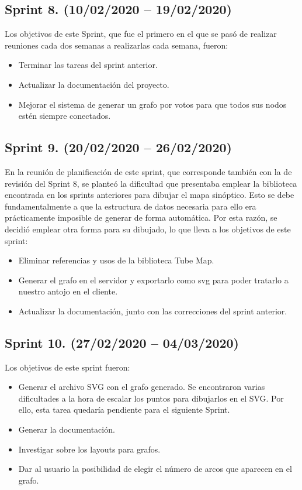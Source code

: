 \subsection{Sprint 8. (10/02/2020 -- 19/02/2020)}
Los objetivos de este Sprint, que fue el primero en el que se pasó de realizar reuniones cada dos semanas a realizarlas cada semana, fueron:
\begin{itemize}
	\item Terminar las tareas del sprint anterior.
	\item Actualizar la documentación del proyecto.
	\item Mejorar el sistema de generar un grafo por votos para que todos sus nodos estén siempre conectados.
\end{itemize}

\subsection{Sprint 9. (20/02/2020 -- 26/02/2020)}
En la reunión de planificación de este sprint, que corresponde también con la de revisión del Sprint 8, se planteó la dificultad que presentaba emplear la biblioteca encontrada en los sprints anteriores para dibujar el mapa sinóptico. Esto se debe fundamentalmente a que la estructura de datos necesaria para ello era prácticamente imposible de generar de forma automática.
Por esta razón, se decidió emplear otra forma para su dibujado, lo que lleva a los objetivos de este sprint:
\begin{itemize}
	\item Eliminar referencias y usos de la biblioteca Tube Map.
	\item Generar el grafo en el servidor y exportarlo como svg para poder tratarlo a nuestro antojo en el cliente.
	\item Actualizar la documentación, junto con las correcciones del sprint anterior.
\end{itemize}

\subsection{Sprint 10. (27/02/2020 -- 04/03/2020)}
Los objetivos de este sprint fueron:
\begin{itemize}
	\item Generar el archivo SVG con el grafo generado. Se encontraron varias dificultades a la hora de escalar los puntos para dibujarlos en el SVG. Por ello, esta tarea quedaría pendiente para el siguiente Sprint.
	\item Generar la documentación.
	\item Investigar sobre los layouts para grafos.
	\item Dar al usuario la posibilidad de elegir el número de arcos que aparecen en el grafo.
\end{itemize}


